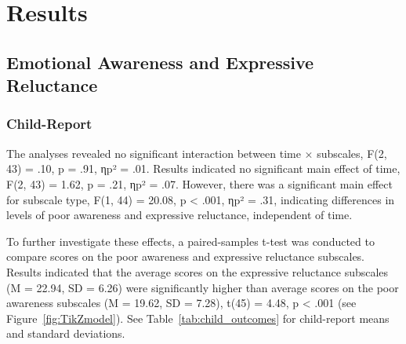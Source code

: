 \section{Results}
\subsection{Emotional Awareness and Expressive Reluctance}
\subsubsection{Child-Report} 

The analyses revealed no significant interaction between time × subscales, F(2, 43) = .10, p = .91, ηp² = .01. Results indicated no significant main effect of time, F(2, 43) = 1.62, p = .21, ηp² = .07. However, there was a significant main effect for subscale type, F(1, 44) = 20.08, p < .001, ηp² = .31, indicating differences in levels of poor awareness and expressive reluctance, independent of time. 

To further investigate these effects, a paired-samples t-test was conducted to compare scores on the poor awareness and expressive reluctance subscales. Results indicated that the average scores on the expressive reluctance subscales (M = 22.94, SD = 6.26) were significantly higher than average scores on the poor awareness subscales (M = 19.62, SD = 7.28), t(45) = 4.48, p < .001 (see Figure~\ref{fig:TikZmodel}). See Table~\ref{tab:child_outcomes} for child-report means and standard deviations.

